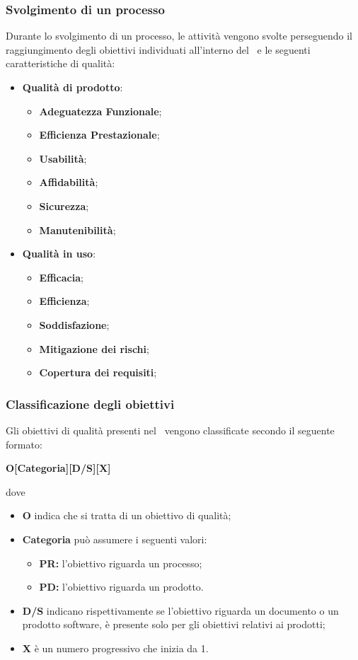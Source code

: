 \subsubsection{Svolgimento di un processo}
Durante lo svolgimento di un processo, le attività vengono svolte perseguendo il raggiungimento degli obiettivi individuati all'interno del \PdQv{}\ e le seguenti caratteristiche di qualità:
\begin{itemize}
	\item \textbf{Qualità di prodotto}: 
	\begin{itemize}
		\item \textbf{Adeguatezza Funzionale};
		\item \textbf{Efficienza Prestazionale};
		\item \textbf{Usabilità};
		\item \textbf{Affidabilità};
		\item \textbf{Sicurezza};
		\item \textbf{Manutenibilità};
	\end{itemize}
	\item \textbf{Qualità in uso}: 
	\begin{itemize}
		\item \textbf{Efficacia};
		\item \textbf{Efficienza};
		\item \textbf{Soddisfazione};
		\item \textbf{Mitigazione dei rischi};
		\item \textbf{Copertura dei requisiti};
	\end{itemize}
\end{itemize}
\subsubsection{Classificazione degli obiettivi}
Gli obiettivi di qualità presenti nel \PdQv{}\ vengono classificate secondo il seguente formato:
\begin{center}
	\textbf{O[Categoria][D/S][X]}
\end{center}
dove 
\begin{itemize}
	\item \textbf{O} indica che si tratta di un obiettivo di qualità;
	\item \textbf{Categoria} può assumere i seguenti valori:
	\begin{itemize}
		\item \textbf{PR:} l'obiettivo riguarda un processo;
		\item \textbf{PD:} l'obiettivo riguarda un prodotto.
	\end{itemize}
	\item \textbf{D/S} indicano rispettivamente se l'obiettivo riguarda un documento o un prodotto software, è presente solo per gli obiettivi relativi ai prodotti;
	\item \textbf{X} è un numero progressivo che inizia da 1.
\end{itemize}
